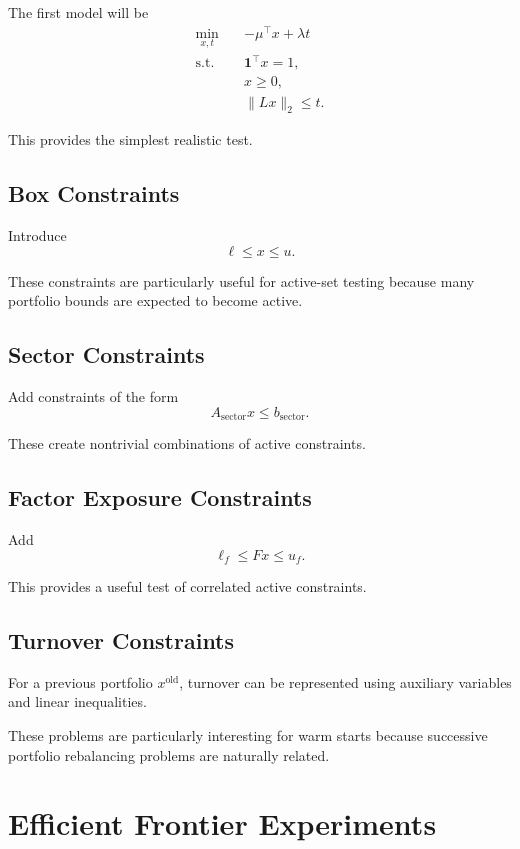 \documentclass[11pt,a4paper]{article}
\begin{document}
The first model will be
\begin{equation}
\begin{aligned}
\min_{x,t}\quad&
-\mu^\top x+\lambda t\\
\text{s.t.}\quad&
\mathbf{1}^\top x=1,\\
&x\geq0,\\
&\|Lx\|_2\leq t.
\end{aligned}
\tag{8}
\end{equation}

This provides the simplest realistic test.

\subsection{Box Constraints}

Introduce
\[
\ell\leq x\leq u.
\]

These constraints are particularly useful for active-set testing
because many portfolio bounds are expected to become active.

\subsection{Sector Constraints}

Add constraints of the form
\[
A_{\mathrm{sector}}x\leq b_{\mathrm{sector}}.
\]

These create nontrivial combinations of active constraints.

\subsection{Factor Exposure Constraints}

Add
\[
\ell_f\leq Fx\leq u_f.
\]

This provides a useful test of correlated active constraints.

\subsection{Turnover Constraints}

For a previous portfolio $x^{\mathrm{old}}$, turnover can be
represented using auxiliary variables and linear inequalities.

These problems are particularly interesting for warm starts because
successive portfolio rebalancing problems are naturally related.

\section{Efficient Frontier Experiments}
\end{document}
